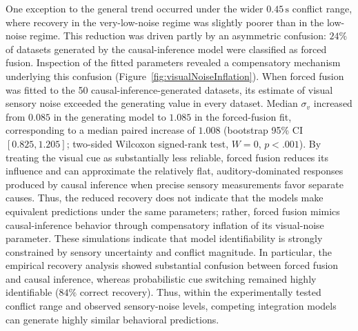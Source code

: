 \documentclass{biorxiv}
\begin{document}
One exception to the general trend occurred under the wider \(0.45\,\mathrm{s}\) conflict range, where recovery in the very-low-noise regime was slightly poorer than in the low-noise regime. This reduction was driven partly by an asymmetric confusion: \(24\%\) of datasets generated by the causal-inference model were classified as forced fusion. Inspection of the fitted parameters revealed a compensatory mechanism underlying this confusion (Figure~\ref{fig:visualNoiseInflation}). When forced fusion was fitted to the 50 causal-inference-generated datasets, its estimate of visual sensory noise exceeded the generating value in every dataset. Median \(\sigma_v\) increased from \(0.085\) in the generating model to \(1.085\) in the forced-fusion fit, corresponding to a median paired increase of \(1.008\) (bootstrap 95\% CI \([0.825,1.205]\); two-sided Wilcoxon signed-rank test, \(W=0\), \(p<.001\)). By treating the visual cue as substantially less reliable, forced fusion reduces its influence and can approximate the relatively flat, auditory-dominated responses produced by causal inference when precise sensory measurements favor separate causes. Thus, the reduced recovery does not indicate that the models make equivalent predictions under the same parameters; rather, forced fusion mimics causal-inference behavior through compensatory inflation of its visual-noise parameter.
These simulations indicate that model identifiability is strongly constrained by sensory uncertainty and conflict magnitude. In particular, the empirical recovery analysis showed substantial confusion between forced fusion and causal inference, whereas probabilistic cue switching remained highly identifiable ($84\%$ correct recovery). Thus, within the experimentally tested conflict range and observed sensory-noise levels, competing integration models can generate highly similar behavioral predictions.

\end{document}
